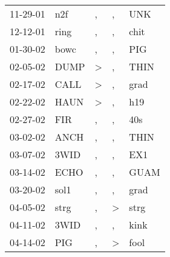 \begin{supertabular}{p{0.07\textwidth}p{0.06\textwidth}p{0.02\textwidth}p{0.02\textwidth}p{0.06\textwidth}}
          11-29-01\textsuperscript{} &            n2f\textsuperscript{} &                , &                , &            UNK\textsuperscript{} \\
          12-12-01\textsuperscript{} &           ring\textsuperscript{} &                , &                , &           chit\textsuperscript{} \\
          01-30-02\textsuperscript{} &           bowc\textsuperscript{} &                , &                , &            PIG\textsuperscript{} \\
          02-05-02\textsuperscript{} &           DUMP\textsuperscript{} &     \textgreater &                , &           THIN\textsuperscript{} \\
          02-17-02\textsuperscript{} &           CALL\textsuperscript{} &     \textgreater &                , &           grad\textsuperscript{} \\
          02-22-02\textsuperscript{} &           HAUN\textsuperscript{} &     \textgreater &                , &            h19\textsuperscript{} \\
          02-27-02\textsuperscript{} &            FIR\textsuperscript{} &                , &                , &            40s\textsuperscript{} \\
          03-02-02\textsuperscript{} &           ANCH\textsuperscript{} &                , &                , &           THIN\textsuperscript{} \\
          03-07-02\textsuperscript{} &           3WID\textsuperscript{} &                , &                , &            EX1\textsuperscript{} \\
          03-14-02\textsuperscript{} &           ECHO\textsuperscript{} &                , &                , &           GUAM\textsuperscript{} \\
          03-20-02\textsuperscript{} &           sol1\textsuperscript{} &                , &                , &           grad\textsuperscript{} \\
          04-05-02\textsuperscript{} &           strg\textsuperscript{} &                , &     \textgreater &           strg\textsuperscript{} \\
          04-11-02\textsuperscript{} &           3WID\textsuperscript{} &                , &                , &           kink\textsuperscript{} \\
          04-14-02\textsuperscript{} &            PIG\textsuperscript{} &                , &     \textgreater &           fool\textsuperscript{} \\

\end{supertabular}
